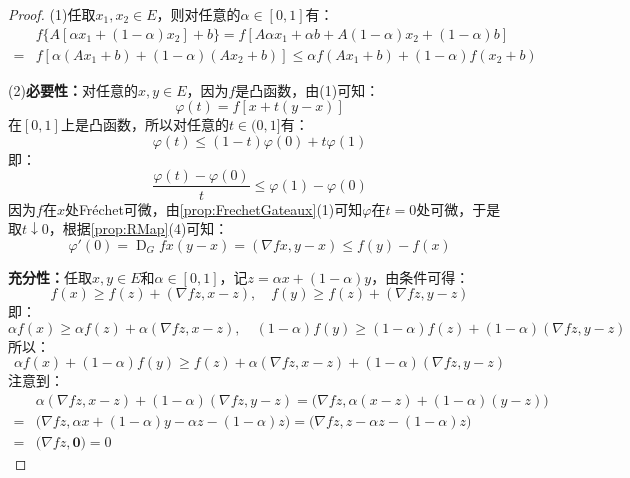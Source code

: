 \begin{proof}
	(1)任取$x_1,x_2\in E$，则对任意的$\alpha\in[0,1]$有：
	\begin{align*}
		&f\{A[\alpha x_1+(1-\alpha)x_2]+b\}=f[A\alpha x_1+\alpha b+A(1-\alpha)x_2+(1-\alpha)b] \\
		=&f[\alpha(Ax_1+b)+(1-\alpha)(Ax_2+b)]\leqslant\alpha f(Ax_1+b)+(1-\alpha)f(x_2+b)
	\end{align*}\par
	(2)\textbf{必要性：}对任意的$x,y\in E$，因为$f$是凸函数，由(1)可知：
	\begin{equation*}
		\varphi(t)=f[x+t(y-x)]
	\end{equation*}
	在$[0,1]$上是凸函数，所以对任意的$t\in(0,1]$有：
	\begin{equation*}
		\varphi(t)\leqslant(1-t)\varphi(0)+t\varphi(1)
	\end{equation*}
	即：
	\begin{equation*}
		\frac{\varphi(t)-\varphi(0)}{t}\leqslant\varphi(1)-\varphi(0)
	\end{equation*}
	因为$f$在$x$处Fr\'echet可微，由\cref{prop:FrechetGateaux}(1)可知$\varphi$在$t=0$处可微，于是取$t\downarrow0$，根据\cref{prop:RMap}(4)可知：
	\begin{equation*}
		\varphi'(0)=\operatorname{D}_Gfx(y-x)=(\nabla fx,y-x)\leqslant f(y)-f(x)
	\end{equation*}\par
	\textbf{充分性：}任取$x,y\in E$和$\alpha\in[0,1]$，记$z=\alpha x+(1-\alpha)y$，由条件可得：
	\begin{equation*}
		f(x)\geqslant f(z)+(\nabla fz,x-z),\quad f(y)\geqslant f(z)+(\nabla fz,y-z)
	\end{equation*}
	即：
	\begin{equation*}
		\alpha f(x)\geqslant\alpha f(z)+\alpha(\nabla fz,x-z),\quad(1-\alpha)f(y)\geqslant(1-\alpha)f(z)+(1-\alpha)(\nabla fz,y-z)
	\end{equation*}
	所以：
	\begin{equation*}
		\alpha f(x)+(1-\alpha)f(y)\geqslant f(z)+\alpha(\nabla fz,x-z)+(1-\alpha)(\nabla fz,y-z)
	\end{equation*}
	注意到：
	\begin{align*}
		&\alpha(\nabla fz,x-z)+(1-\alpha)(\nabla fz,y-z)=\Big(\nabla fz,\alpha(x-z)+(1-\alpha)(y-z)\Big) \\
		=&\Big(\nabla fz,\alpha x+(1-\alpha)y-\alpha z-(1-\alpha)z\Big)=\Big(\nabla fz,z-\alpha z-(1-\alpha)z\Big) \\
		=&\Big(\nabla fz,\mathbf{0}\Big)=0

\end{align*}
\end{proof}
